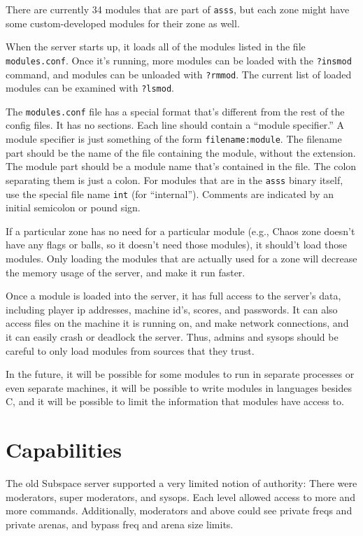 \documentclass{article}
\newcommand{\asss}{\texttt{asss}}
\begin{document}
There are currently
34
modules that are part of \asss{}, but each zone might have some
custom-developed modules for their zone as well.

When the server starts up, it loads all of the modules listed in the
file \verb/modules.conf/. Once it's running, more modules can be loaded
with the \verb/?insmod/ command, and modules can be unloaded with
\verb/?rmmod/. The current list of loaded modules can be examined with
\verb/?lsmod/.

The \verb/modules.conf/ file has a special format that's different from
the rest of the config files. It has no sections. Each line should
contain a ``module specifier.'' A module specifier is just something of
the form \verb/filename:module/. The filename part should be the name of
the file containing the module, without the extension. The module part
should be a module name that's contained in the file. The colon
separating them is just a colon. For modules that are in the \asss{}
binary itself, use the special file name \verb/int/ (for ``internal'').
Comments are indicated by an initial semicolon or pound sign.

If a particular zone has no need for a particular module (e.g., Chaos
zone doesn't have any flags or balls, so it doesn't need those modules),
it should't load those modules. Only loading the modules that are
actually used for a zone will decrease the memory usage of the server,
and make it run faster.

Once a module is loaded into the server, it has full access to the
server's data, including player ip addresses, machine id's, scores, and
passwords. It can also access files on the machine it is running on, and
make network connections, and it can easily crash or deadlock the
server. Thus, admins and sysops should be careful to only load modules
from sources that they trust.

In the future, it will be possible for some modules to run in separate
processes or even separate machines, it will be possible to write
modules in languages besides C, and it will be possible to limit the
information that modules have access to.


\section{Capabilities}

The old Subspace server supported a very limited notion of authority:
There were moderators, super moderators, and sysops. Each level allowed
access to more and more commands. Additionally, moderators and above
could see private freqs and private arenas, and bypass freq and arena
size limits.
\end{document}
